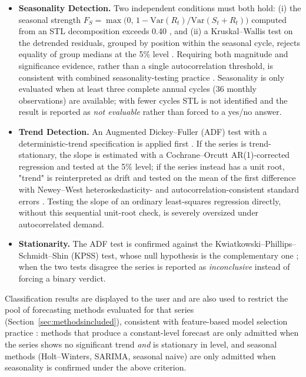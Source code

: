 \documentclass[forecasting,article,submit,pdftex,moreauthors]{Definitions/mdpi}
\begin{document}
\begin{itemize}
\item \textbf{Seasonality Detection.} Two independent conditions must both hold: (i) the seasonal strength $F_S = \max\!\big(0,\, 1 - \mathrm{Var}(R_t)/\mathrm{Var}(S_t+R_t)\big)$ computed from an STL decomposition exceeds 0.40 \cite{wang2006}, and (ii) a Kruskal--Wallis test on the detrended residuals, grouped by position within the seasonal cycle, rejects equality of group medians at the 5\% level \cite{kruskal1952}. Requiring both magnitude and significance evidence, rather than a single autocorrelation threshold, is consistent with combined seasonality-testing practice \cite{ollechwebel2020}. Seasonality is only evaluated when at least three complete annual cycles (36 monthly observations) are available; with fewer cycles STL is not identified and the result is reported as \emph{not evaluable} rather than forced to a yes/no answer.
\item \textbf{Trend Detection.} An Augmented Dickey--Fuller (ADF) test with a deterministic-trend specification is applied first \cite{dickeyfuller1979}. If the series is trend-stationary, the slope is estimated with a Cochrane--Orcutt AR(1)-corrected regression \cite{cochraneorcutt1949} and tested at the 5\% level; if the series instead has a unit root, "trend" is reinterpreted as drift and tested on the mean of the first difference with Newey--West heteroskedasticity- and autocorrelation-consistent standard errors \cite{neweywest1987}. Testing the slope of an ordinary least-squares regression directly, without this sequential unit-root check, is severely oversized under autocorrelated demand.
\item \textbf{Stationarity.} The ADF test is confirmed against the Kwiatkowski--Phillips--Schmidt--Shin (KPSS) test, whose null hypothesis is the complementary one \cite{kpss1992}; when the two tests disagree the series is reported as \emph{inconclusive} instead of forcing a binary verdict.
\end{itemize}

Classification results are displayed to the user and are also used to restrict the pool of forecasting methods evaluated for that series (Section~\ref{sec:methodsincluded}), consistent with feature-based model selection practice \cite{monteromanso2020,talagala2021}: methods that produce a constant-level forecast are only admitted when the series shows no significant trend \emph{and} is stationary in level, and seasonal methods (Holt--Winters, SARIMA, seasonal naive) are only admitted when seasonality is confirmed under the above criterion.
\end{document}
